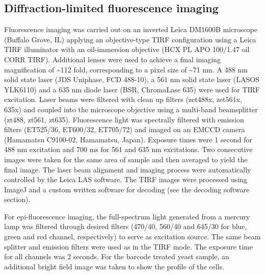 \subsection{Diffraction-limited fluorescence imaging}
Fluorescence imaging was carried out on an inverted Leica DM1600B microscope (Buffalo Grove, IL) applying an objective-type TIRF configuration using a Leica TIRF illuminator with an oil-immersion objective (HCX PL APO 100/1.47 oil CORR TIRF). Additional lenses were used to achieve a final imaging magnification of \textasciitilde112 fold, corresponding to a pixel size of \textasciitilde71 nm. A 488 nm solid state laser (JDS Uniphase, FCD 488-10), a 561 nm solid state laser (LASOS YLK6110) and a 635 nm diode laser (BSR, ChromaLase 635) were used for TIRF excitation. Laser beams were filtered with clean up filters (zet488x, zet561x, 635x) and coupled into the microscope objective using a multi-band beamsplitter (zt488, zt561, zt635). Fluorescence light was spectrally filtered with emission filters (ET525/36, ET600/32, ET705/72) and imaged on an EMCCD camera (Hamamatsu C9100-02, Hamamatsu, Japan). Exposure times were 1 second for 488 nm excitation and 700 ms for 561 and 635 nm excitations. Two consecutive images were taken for the same area of sample and then averaged to yield the final image. The laser beam alignment and imaging process were automatically controlled by the Leica LAS software. The TIRF images were processed using ImageJ and a custom written software for decoding (see the decoding software section).

For epi-fluorescence imaging, the full-spectrum light generated from a mercury lamp was filtered through desired filters (470/40, 560/40 and 645/30 for blue, green and red channel, respectively) to serve as excitation source. The same beam splitter and emission filters were used as in the TIRF mode. The exposure time for all channels was 2 seconds. For the barcode treated yeast sample, an additional bright field image was taken to show the profile of the cells. 

